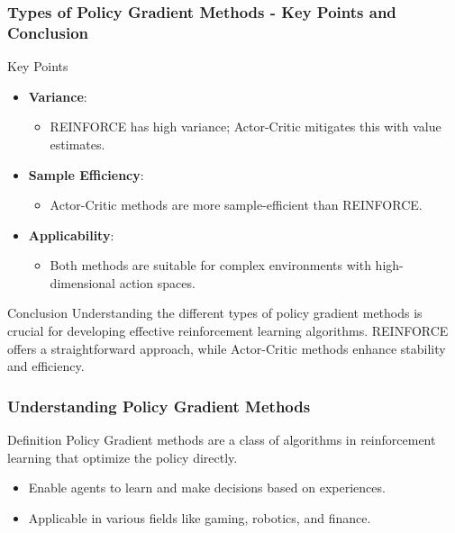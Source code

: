 \documentclass{beamer}
\begin{document}
\begin{frame}[fragile]
    \frametitle{Types of Policy Gradient Methods - Key Points and Conclusion}
    \begin{block}{Key Points}
        \begin{itemize}
            \item \textbf{Variance}:
            \begin{itemize}
                \item REINFORCE has high variance; Actor-Critic mitigates this with value estimates.
            \end{itemize}
            \item \textbf{Sample Efficiency}:
            \begin{itemize}
                \item Actor-Critic methods are more sample-efficient than REINFORCE.
            \end{itemize}
            \item \textbf{Applicability}:
            \begin{itemize}
                \item Both methods are suitable for complex environments with high-dimensional action spaces.
            \end{itemize}
        \end{itemize}
    \end{block}
    \begin{block}{Conclusion}
        Understanding the different types of policy gradient methods is crucial for developing effective reinforcement learning algorithms. REINFORCE offers a straightforward approach, while Actor-Critic methods enhance stability and efficiency.
    \end{block}
\end{frame}

\begin{frame}
    \titlepage
\end{frame}

\begin{frame}[fragile]
    \frametitle{Understanding Policy Gradient Methods}
    \begin{block}{Definition}
        Policy Gradient methods are a class of algorithms in reinforcement learning that optimize the policy directly. 
    \end{block}
    \begin{itemize}
        \item Enable agents to learn and make decisions based on experiences.
        \item Applicable in various fields like gaming, robotics, and finance.
    \end{itemize}
\end{frame}
\end{document}
